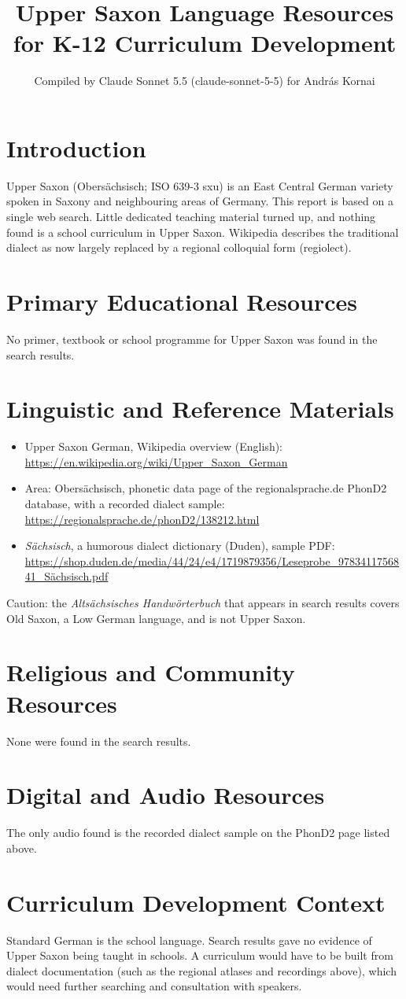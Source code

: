 \documentclass[12pt]{article}
\title{Upper Saxon Language Resources for K-12 Curriculum Development}
\author{Compiled by Claude Sonnet 5.5 (claude-sonnet-5-5) for Andr\'as Kornai}
\date{}
\begin{document}
\maketitle

\section{Introduction}
Upper Saxon (Obers\"achsisch; ISO 639-3 sxu) is an East Central German variety spoken in Saxony and neighbouring areas of Germany. This report is based on a single web search. Little dedicated teaching material turned up, and nothing found is a school curriculum in Upper Saxon. Wikipedia describes the traditional dialect as now largely replaced by a regional colloquial form (regiolect).

\section{Primary Educational Resources}
No primer, textbook or school programme for Upper Saxon was found in the search results.

\section{Linguistic and Reference Materials}
\begin{itemize}
\item Upper Saxon German, Wikipedia overview (English): \url{https://en.wikipedia.org/wiki/Upper_Saxon_German}
\item Area: Obers\"achsisch, phonetic data page of the regionalsprache.de PhonD2 database, with a recorded dialect sample: \url{https://regionalsprache.de/phonD2/138212.html}
\item \emph{S\"achsisch}, a humorous dialect dictionary (Duden), sample PDF: \url{https://shop.duden.de/media/44/24/e4/1719879356/Leseprobe_9783411756841_Sächsisch.pdf}
\end{itemize}
Caution: the \emph{Altsächsisches Handwörterbuch} that appears in search results covers Old Saxon, a Low German language, and is not Upper Saxon.

\section{Religious and Community Resources}
None were found in the search results.

\section{Digital and Audio Resources}
The only audio found is the recorded dialect sample on the PhonD2 page listed above.

\section{Curriculum Development Context}
Standard German is the school language. Search results gave no evidence of Upper Saxon being taught in schools. A curriculum would have to be built from dialect documentation (such as the regional atlases and recordings above), which would need further searching and consultation with speakers.
\end{document}
